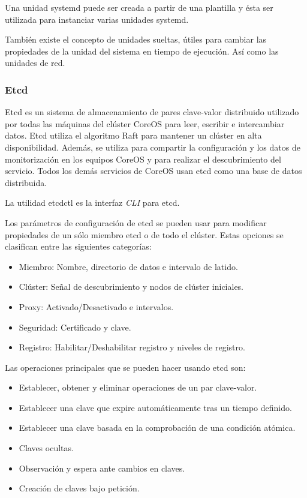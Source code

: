 Una unidad systemd puede ser creada a partir de una plantilla y ésta ser utilizada para instanciar varias unidades systemd.

También existe el concepto de unidades sueltas, útiles para cambiar las propiedades de la unidad del sistema en tiempo de ejecución. Así como las unidades de red.

\subsubsection{Etcd}

Etcd es un sistema de almacenamiento de pares clave-valor distribuido utilizado por todas las máquinas del clúster CoreOS para leer, escribir e intercambiar datos. Etcd utiliza el algoritmo Raft para mantener un clúster en alta disponibilidad. Además, se utiliza para compartir la configuración y los datos de monitorización en los equipos CoreOS y para realizar el descubrimiento del servicio. Todos los demás servicios de CoreOS usan etcd como una base de datos distribuida. 

La utilidad etcdctl es la interfaz \textit{CLI} para etcd.

Los parámetros de configuración de etcd se pueden usar para modificar propiedades de un sólo miembro etcd o de todo el clúster. Estas opciones se clasifican entre las siguientes categorías:

\begin{itemize}
\item Miembro: Nombre, directorio de datos e intervalo de latido.
\item Clúster: Señal de descubrimiento y nodos de clúster iniciales.
\item Proxy: Activado/Desactivado e intervalos.
\item Seguridad: Certificado y clave.
\item Registro: Habilitar/Deshabilitar registro y niveles de registro.
\end{itemize}

Las operaciones principales que se pueden hacer usando etcd son:

\begin{itemize}
\item Establecer, obtener y eliminar operaciones de un par clave-valor.
\item Establecer una clave que expire automáticamente tras un tiempo definido. 
\item Establecer una clave basada en la comprobación de una condición atómica.
\item Claves ocultas.
\item Observación y espera ante cambios en claves.
\item Creación de claves bajo petición.
\end{itemize}

